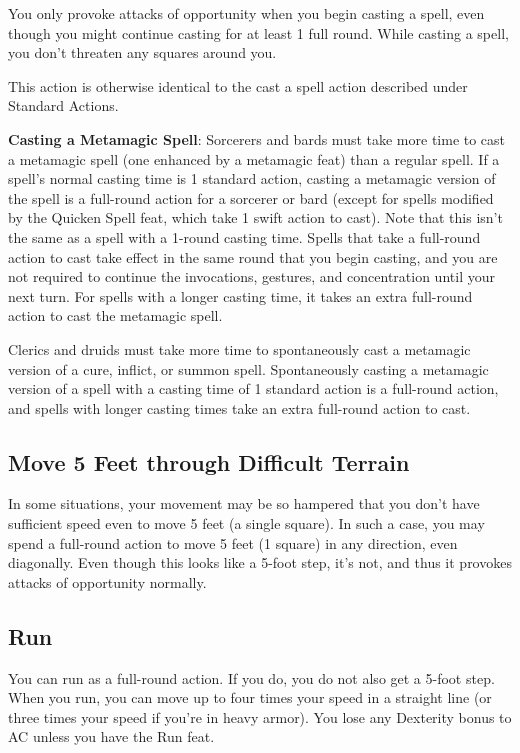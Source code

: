 You only provoke attacks of opportunity when you begin casting a spell, even though you might continue casting for at least 1 full round. While casting a spell, you don't threaten any squares around you.
				
This action is otherwise identical to the cast a spell action described under Standard Actions.
				
\textbf{Casting a Metamagic Spell}: Sorcerers and bards must take more time to cast a metamagic spell (one enhanced by a metamagic feat) than a regular spell. If a spell's normal casting time is 1 standard action, casting a metamagic version of the spell is a full-round action for a sorcerer or bard (except for spells modified by the Quicken Spell feat, which take 1 swift action to cast). Note that this isn't the same as a spell with a 1-round casting time. Spells that take a full-round action to cast take effect in the same round that you begin casting, and you are not required to continue the invocations, gestures, and concentration until your next turn. For spells with a longer casting time, it takes an extra full-round action to cast the metamagic spell.
				
Clerics and druids must take more time to spontaneously cast a metamagic version of a cure, inflict, or summon spell. Spontaneously casting a metamagic version of a spell with a casting time of 1 standard action is a full-round action, and spells with longer casting times take an extra full-round action to cast.
				
\subsection{Move 5 Feet through Difficult Terrain}

				
In some situations, your movement may be so hampered that you don't have sufficient speed even to move 5 feet (a single square). In such a case, you may spend a full-round action to move 5 feet (1 square) in any direction, even diagonally. Even though this looks like a 5-foot step, it's not, and thus it provokes attacks of opportunity normally.
				
\subsection{Run}

				
You can run as a full-round action. If you do, you do not also get a 5-foot step. When you run, you can move up to four times your speed in a straight line (or three times your speed if you're in heavy armor). You lose any Dexterity bonus to AC unless you have the Run feat. 
				
